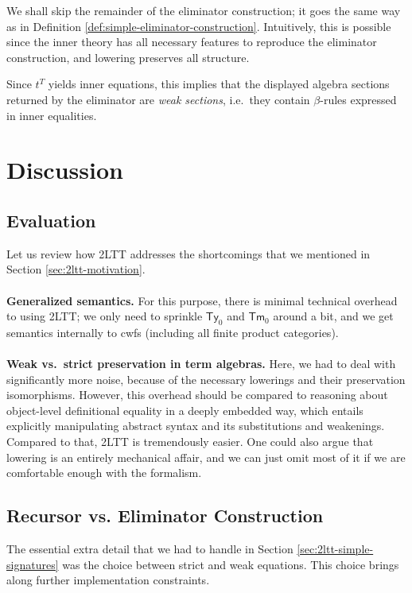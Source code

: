 \documentclass[12pt,a4paper,twoside,openany]{book}
\theoremstyle{remark}
\theoremstyle{definition}
\theoremstyle{theorem}
\newcommand{\Tm}{\mathsf{Tm}}
\newcommand{\Ty}{\mathsf{Ty}}
\begin{document}
We shall skip the remainder of the eliminator construction; it goes the same way
as in Definition \ref{def:simple-eliminator-construction}. Intuitively, this is
possible since the inner theory has all necessary features to reproduce the
eliminator construction, and lowering preserves all structure.

Since $t^T$ yields inner equations, this implies that the displayed algebra
sections returned by the eliminator are \emph{weak sections}, i.e.\ they contain
$\beta$-rules expressed in inner equalities.

\section{Discussion}

\subsection{Evaluation}

Let us review how 2LTT addresses the shortcomings that we mentioned in Section
\ref{sec:2ltt-motivation}.
\\\\
\textbf{Generalized semantics.} For this purpose, there is minimal
technical overhead to using 2LTT; we only need to sprinkle $\Ty_0$ and $\Tm_0$
around a bit, and we get semantics internally to cwfs (including all finite product
categories).
\\\\
\textbf{Weak vs.\ strict preservation in term algebras.}
Here, we had to deal with significantly more noise, because of the necessary
lowerings and their preservation isomorphisms. However, this overhead should be
compared to reasoning about object-level definitional equality in a deeply
embedded way, which entails explicitly manipulating abstract syntax and its
substitutions and weakenings. Compared to that, 2LTT is tremendously easier. One
could also argue that lowering is an entirely mechanical affair, and we can just
omit most of it if we are comfortable enough with the formalism.

\subsection{Recursor vs. Eliminator Construction}

The essential extra detail that we
had to handle in Section \ref{sec:2ltt-simple-signatures} was the choice between
strict and weak equations. This choice brings along further implementation
constraints.
\end{document}
